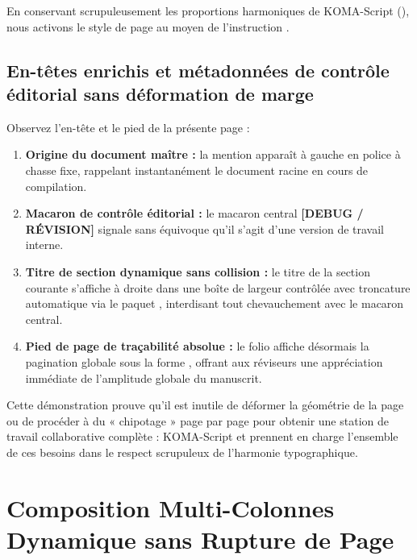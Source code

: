 En conservant scrupuleusement les proportions harmoniques de KOMA-Script (),
nous activons le style de page 
au moyen de l'instruction .

\subsection{En-têtes enrichis et métadonnées de contrôle éditorial sans déformation de marge}
Observez l'en-tête et le pied de la présente page :
\begin{enumerate}
  \item \textbf{Origine du document maître :} la mention  apparaît à gauche en police à chasse fixe,
  rappelant instantanément le document racine en cours de compilation.
  \item \textbf{Macaron de contrôle éditorial :} le macaron central \textbf{\textcolor{ThesisAccent}{[DEBUG / RÉVISION]}}
  signale sans équivoque qu'il s'agit d'une version de travail interne.
  \item \textbf{Titre de section dynamique sans collision :}
  le titre de la section courante s'affiche à droite dans une boîte de largeur contrôlée avec troncature automatique
  via le paquet , interdisant tout chevauchement avec le macaron central.
  \item \textbf{Pied de page de traçabilité absolue :}
  le folio affiche désormais la pagination globale sous la forme ,
  offrant aux réviseurs une appréciation immédiate de l'amplitude globale du manuscrit.
\end{enumerate}

Cette démonstration prouve qu'il est inutile de déformer la géométrie de la page
ou de procéder à du « chipotage » page par page pour obtenir une station de travail collaborative complète :
KOMA-Script et  prennent en charge l'ensemble de ces besoins
dans le respect scrupuleux de l'harmonie typographique.

\activerStyleStandard

\section{Composition Multi-Colonnes Dynamique sans Rupture de Page}
\label{sec:demo-multicol}

